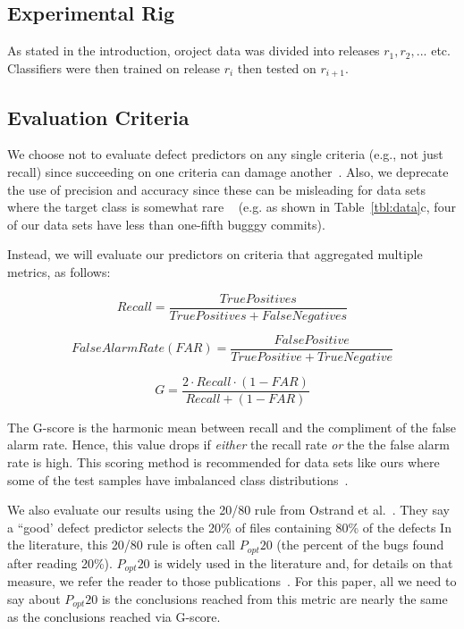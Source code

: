 \documentclass[10pt,journal,compsoc]{IEEEtran}
\newcommand{\tbl}[1]{Table~\ref{tbl:#1}}
\begin{document}
\subsection{Experimental Rig}
As stated in the introduction,
oroject data
was divided into releases $r_1, r_2,... $ etc.
Classifiers were then trained on release $r_i$ 
then tested on $r_{i+1}$. 

\subsection{Evaluation Criteria }


We choose not to evaluate defect predictors on any single criteria (e.g., not just   recall)
since succeeding on one criteria can damage another~\cite{fu2016tuning}. Also,
we deprecate the use of  precision and accuracy since these can be misleading for data sets where the target class is somewhat
rare ~\cite{Menzies:2007prec}
(e.g. as shown in \tbl{data}c, four of our data sets have less than one-fifth bugggy commits). 

Instead, we will evaluate our predictors on criteria
that aggregated multiple metrics, as follows: 


 
{\small
\begin{equation}\label{eq:recall}
 \mathit{Recall} = \frac{\mathit{TruePositives}}{\mathit{TruePositives} + \mathit{FalseNegatives}}
 \end{equation}
 
 
\begin{equation}\label{eq:far}
 \mathit{FalseAlarm Rate(FAR)} = \frac{\mathit{FalsePositive}}{\mathit{TruePositive} + \mathit{TrueNegative}}
 \end{equation}


\begin{equation}\label{eq:g}
\mathit{G} = \frac{2 \cdot \mathit{Recall} \cdot \mathit{(1 - FAR)} }{\mathit{Recall} + (1 - \mathit{FAR})}
 \end{equation}}

The  G-score is the   harmonic mean between recall and the compliment
of the false alarm rate. Hence, this value drops if
{\em either} the recall rate {\em or} the the false alarm rate is   high.
This scoring method  is recommended for data sets like ours where some
of the test samples have  imbalanced class distributions~\cite{shatnawi10g1,comments07}.  


We  also evaluate our results using the 20/80 rule from Ostrand et al.~\cite{ostrand05_predicting}. They say
a   ``good'
defect predictor selects the
  20\% of files   containing  80\% 
  of the defects 
  In the 
  literature,
  this 20/80 rule is often call $P_{opt}20$ (the percent of the bugs found after reading 20\%).
  $P_{opt}20$ is widely used in the literature
  and, for details on that measure, we refer the reader to those publications~\cite{menzies07dp, kamei12_jit, yang16effort, monden13cost, mende10effort, monden13cost, lo17_ifa, di18_fft}. For this paper,
  all we need to say about  $P_{opt}20$ is the conclusions reached from this metric
are nearly the same as  the conclusions reached via G-score.
\end{document}
